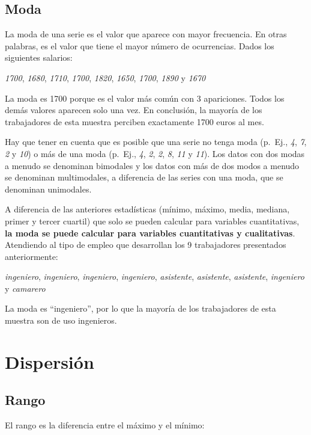 \documentclass[
]{book}
\begin{document}
\hypertarget{moda}{%
\subsection{Moda}\label{moda}}

La moda de una serie es el valor que aparece con mayor frecuencia. En otras palabras, es el valor que tiene el mayor número de ocurrencias. Dados los siguientes salarios:

\emph{1700}, \emph{1680}, \emph{1710}, \emph{1700}, \emph{1820}, \emph{1650}, \emph{1700}, \emph{1890} y \emph{1670}

La moda es 1700 porque es el valor más común con 3 apariciones. Todos los demás valores aparecen solo una vez. En conclusión, la mayoría de los trabajadores de esta muestra perciben exactamente 1700 euros al mes.

Hay que tener en cuenta que es posible que una serie no tenga moda (p.~Ej., \emph{4}, \emph{7}, \emph{2} y \emph{10}) o más de una moda (p.~Ej., \emph{4}, \emph{2}, \emph{2}, \emph{8}, \emph{11} y \emph{11}). Los datos con dos modas a menudo se denominan bimodales y los datos con más de dos modos a menudo se denominan multimodales, a diferencia de las series con una moda, que se denominan unimodales.

A diferencia de las anteriores estadísticas (mínimo, máximo, media, mediana, primer y tercer cuartil) que solo se pueden calcular para variables cuantitativas, \textbf{la moda se puede calcular para variables cuantitativas y cualitativas}. Atendiendo al tipo de empleo que desarrollan los 9 trabajadores presentados anteriormente:

\emph{ingeniero}, \emph{ingeniero}, \emph{ingeniero}, \emph{ingeniero}, \emph{asistente}, \emph{asistente}, \emph{asistente}, \emph{ingeniero} y \emph{camarero}

La moda es ``ingeniero'', por lo que la mayoría de los trabajadores de esta muestra son de uso ingenieros.

\hypertarget{dispersiuxf3n}{%
\section{Dispersión}\label{dispersiuxf3n}}

\hypertarget{rango}{%
\subsection{Rango}\label{rango}}

El rango es la diferencia entre el máximo y el mínimo:
\end{document}
